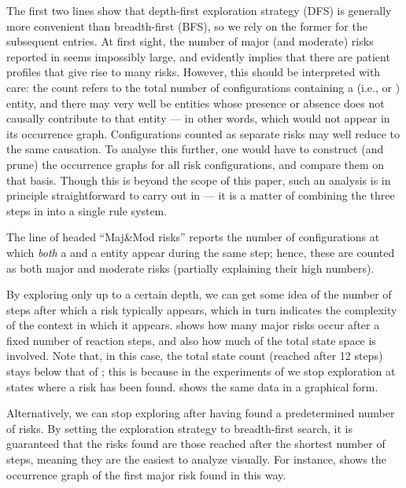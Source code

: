The first two lines show that depth-first exploration strategy (DFS) is generally more convenient than breadth-first (BFS), so we rely on the former for the subsequent entries. At first sight, the number of major (and moderate) risks reported in  seems impossibly large, and evidently implies that there are patient profiles that give rise to many risks. However, this should be interpreted with care: the count refers to the total number of configurations containing a \Forbidden (i.e., \major or \minor) entity, and there may very well be entities whose presence or absence does not causally contribute to that \Forbidden entity --- in other words, which would not appear in its occurrence graph. Configurations counted as separate risks may well reduce to the same causation. To analyse this further, one would have to construct (and prune) the occurrence graphs for all risk configurations, and compare them on that basis. Though this is beyond the scope of this paper, such an analysis is in principle straightforward to carry out in \GROOVE --- it is a matter of combining the three steps in  into a single rule system.

The line of  headed ``Maj\&Mod risks'' reports the number of configurations at which \emph{both} a \major and a \moderate entity appear during the same step; hence, these are counted as both major and moderate risks (partially explaining their high numbers).
 
\medskip\noindent By exploring only up to a certain depth, we can get some idea of the number of steps after which a risk typically appears, which in turn indicates the complexity of the context in which it appears.  shows how many major risks occur after a fixed number of reaction steps, and also how much of the total state space is involved. Note that, in this case, the total state count (reached after 12 steps) stays below that of ; this is because in the experiments of  we stop exploration at states where a risk has been found.  shows the same data in a graphical form.

\medskip\noindent Alternatively, we can stop exploring after having found a predetermined number of risks. By setting the exploration strategy to breadth-first search, it is guaranteed that the risks found are those reached after the shortest number of steps, meaning they are the easiest to analyze visually. For instance,  shows the occurrence graph of the first major risk found in this way.


